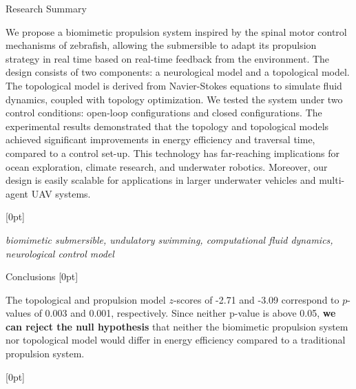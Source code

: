 \documentclass[final, 16pt]{beamer}
\newlength{\colwidth}
\begin{document}
\begin{frame}[t]
\begin{columns}[t]
\begin{column}{\colwidth}
\begin{block}{Research Summary}
    \vspace{0.5cm}

    We propose a biomimetic propulsion system inspired by the spinal motor control mechanisms of zebrafish, allowing the submersible to adapt its propulsion strategy in real time based on real-time feedback from the environment. The design consists of two components: a neurological model and a topological model. The topological model is derived from Navier-Stokes equations to simulate fluid dynamics, coupled with topology optimization. We tested the system under two control conditions: open-loop configurations and closed configurations. The experimental results demonstrated that the topology and topological models achieved significant improvements in energy efficiency and traversal time, compared to a control set-up. This technology has far-reaching implications for ocean exploration, climate research, and underwater robotics. Moreover, our design is easily scalable for applications in larger underwater vehicles and multi-agent UAV systems.
    
    [0pt]

    \emph{biomimetic submersible, undulatory swimming, computational fluid dynamics, neurological control model}

    \vspace{0.5cm}
    
  \end{block}

  \begin{block}{Conclusions}
    [0pt]

    \vspace{0.5cm}

    The topological and propulsion model $z$-scores of -2.71 and -3.09 correspond to $p$-values of 0.003 and 0.001, respectively. Since neither p-value is above 0.05, \textbf{we can reject the null hypothesis} that neither the biomimetic propulsion system nor topological model would differ in energy efficiency compared to a traditional propulsion system. 
    
    [0pt]

    \vspace{0.5cm}
    

\end{block}
\end{column}
\end{columns}
\end{frame}
\end{document}
